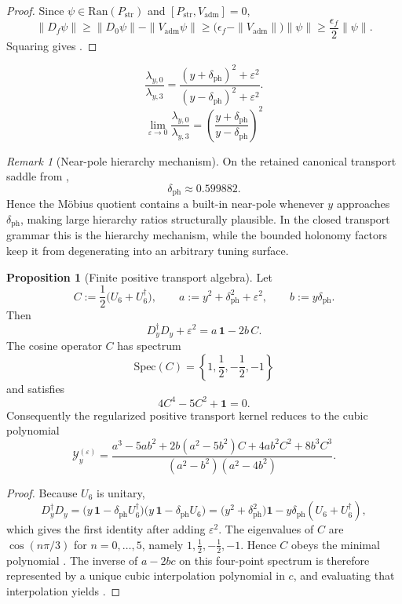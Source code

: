 \documentclass[11pt,a4paper]{article}
\theoremstyle{definition}
\newtheorem{proposition}[theorem]{Proposition}
\theoremstyle{remark}
\newtheorem*{remark}{Remark}
\begin{document}
\begin{proof}
Since $\psi\in\mathrm{Ran}(P_{\mathrm{str}})$ and $[P_{\mathrm{str}},V_{\mathrm{adm}}]=0$,
\[
\|D_f\psi\|
\ge
\|D_0\psi\|-\|V_{\mathrm{adm}}\psi\|
\ge
\bigl(\epsilon_f-\|V_{\mathrm{adm}}\|\bigr)\|\psi\|
\ge
\frac{\epsilon_f}{2}\|\psi\|.
\]
Squaring gives .
\end{proof}

\begin{equation}
\label{eq:mobius-quotient}
\frac{\lambda_{y,0}}{\lambda_{y,3}}
=
\frac{(y+\delta_{\mathrm{ph}})^2+\varepsilon^2}{(y-\delta_{\mathrm{ph}})^2+\varepsilon^2}.
\end{equation}
\[
\lim_{\varepsilon\to 0}\frac{\lambda_{y,0}}{\lambda_{y,3}}
=
\left(\frac{y+\delta_{\mathrm{ph}}}{y-\delta_{\mathrm{ph}}}\right)^2
\]
\begin{remark}[Near-pole hierarchy mechanism]
On the retained canonical transport saddle from ,
\[
\delta_{\mathrm{ph}}\approx \num{0.599882}.
\]
Hence the Möbius quotient contains a built-in near-pole whenever $y$ approaches $\delta_{\mathrm{ph}}$, making large hierarchy ratios structurally plausible. In the closed transport grammar this is the hierarchy mechanism, while the bounded holonomy factors keep it from degenerating into an arbitrary tuning surface.
\end{remark}

\begin{proposition}[Finite positive transport algebra]
\label{prop:finite-positive-transport-algebra}
Let
\[
C:=\frac12\bigl(U_6+U_6^\dagger\bigr),
\qquad
a:=y^2+\delta_{\mathrm{ph}}^2+\varepsilon^2,
\qquad
b:=y\delta_{\mathrm{ph}}.
\]
Then
\[
D_y^\dagger D_y+\varepsilon^2=a\,\mathbf 1-2b\,C.
\]
The cosine operator $C$ has spectrum
\[
\mathrm{Spec}(C)=\left\{1,\frac12,-\frac12,-1\right\}
\]
and satisfies
\begin{equation}
\label{eq:c6-cosine-polynomial}
4C^4-5C^2+\mathbf 1=0.
\end{equation}
Consequently the regularized positive transport kernel reduces to the cubic polynomial
\begin{equation}
\label{eq:finite-positive-transport-kernel}
\mathcal Y_y^{(\varepsilon)}
=
\frac{
a^3-5ab^2
+2b(a^2-5b^2)C
+4ab^2C^2
+8b^3C^3
}{
(a^2-b^2)(a^2-4b^2)
}.
\end{equation}
\end{proposition}

\begin{proof}
Because $U_6$ is unitary,
\[
D_y^\dagger D_y
=
\bigl(y\,\mathbf 1-\delta_{\mathrm{ph}}U_6^\dagger\bigr)
\bigl(y\,\mathbf 1-\delta_{\mathrm{ph}}U_6\bigr)
=
\bigl(y^2+\delta_{\mathrm{ph}}^2\bigr)\mathbf 1
-y\delta_{\mathrm{ph}}(U_6+U_6^\dagger),
\]
which gives the first identity after adding $\varepsilon^2$. The eigenvalues of $C$ are $\cos(n\pi/3)$ for $n=0,\dots,5$, namely $1,\frac12,-\frac12,-1$. Hence $C$ obeys the minimal polynomial . The inverse of $a-2bc$ on this four-point spectrum is therefore represented by a unique cubic interpolation polynomial in $c$, and evaluating that interpolation yields .
\end{proof}
\end{document}
